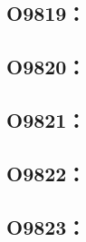 \clearpage
\subsection{O9819：}



\clearpage
\subsection{O9820：}



\clearpage
\subsection{O9821：}



\clearpage
\subsection{O9822：}



\clearpage
\subsection{O9823：}



\clearpage
